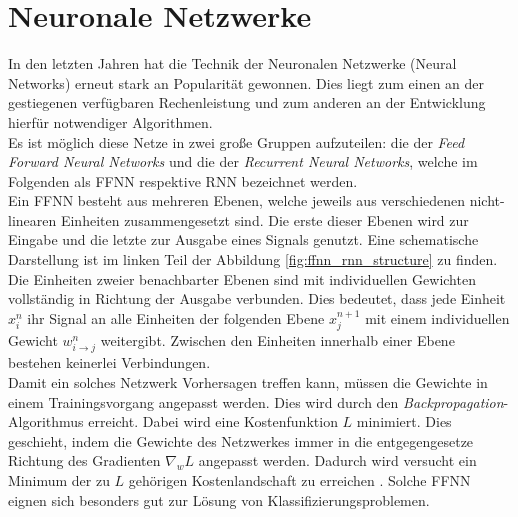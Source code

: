 \section{Neuronale Netzwerke}
In den letzten Jahren hat die Technik der Neuronalen Netzwerke (Neural Networks) erneut stark an Popularität gewonnen. Dies liegt zum einen an der gestiegenen verfügbaren Rechenleistung und zum anderen an der Entwicklung hierfür notwendiger Algorithmen.\\
Es ist möglich diese Netze in zwei große Gruppen aufzuteilen: die der \textit{Feed Forward Neural Networks} und die der \textit{Recurrent Neural Networks}, welche im Folgenden als \textsc{FFNN} respektive \textsc{RNN} bezeichnet werden.\\

Ein \textsc{FFNN} besteht aus mehreren Ebenen, welche jeweils aus verschiedenen nicht-linearen Einheiten zusammengesetzt sind. Die erste dieser Ebenen wird zur Eingabe und die letzte zur Ausgabe eines Signals genutzt. Eine schematische Darstellung ist im linken Teil der Abbildung \ref{fig:ffnn_rnn_structure} zu finden. Die Einheiten zweier benachbarter Ebenen sind mit individuellen Gewichten vollständig in Richtung der Ausgabe verbunden. Dies bedeutet, dass jede Einheit $x^n_i$ ihr Signal an alle Einheiten der folgenden Ebene $x^{n+1}_j$ mit einem individuellen Gewicht $w^n_{i \rightarrow j}$ weitergibt. Zwischen den Einheiten innerhalb einer Ebene bestehen keinerlei Verbindungen.\\
Damit ein solches Netzwerk Vorhersagen treffen kann, müssen die Gewichte in einem Trainingsvorgang angepasst werden. Dies wird durch den \textit{Backpropagation}-Algorithmus erreicht. Dabei wird eine Kostenfunktion $L$ minimiert. Dies geschieht, indem die Gewichte des Netzwerkes immer in die entgegengesetze Richtung des Gradienten $\nabla_w L$ angepasst werden. Dadurch wird versucht ein Minimum der zu $L$ gehörigen Kostenlandschaft zu erreichen \cite[S. 225-290]{bishop}. Solche \textsc{FFNN} eignen sich besonders gut zur Lösung von Klassifizierungsproblemen.\\

